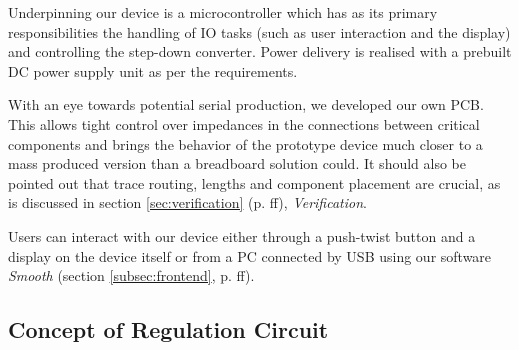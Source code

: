 
Underpinning  our  device  is  a  microcontroller which  has  as  its  primary
responsibilities the  handling of IO tasks  (such as user interaction  and the
display) and  controlling the step-down converter. Power  delivery is realised
with a prebuilt DC power supply unit as per the requirements.

With  an  eye  towards  potential  serial production,  we  developed  our  own
PCB.  This  allows tight  control over impedances  in the  connections between
critical  components and  brings the  behavior  of the  prototype device  much
closer  to  a mass  produced  version  than  a breadboard  solution  could. It
should  also  be  pointed  out  that  trace  routing,  lengths  and  component
placement are crucial,  as is discussed in  section \ref{sec:verification} (p.
\pageref{sec:verification}ff), \emph{Verification}.

Users can  interact with our device  either through a push-twist  button and a
display on the device itself or from  a PC connected by USB using our software
\emph{Smooth} (section \ref{subsec:frontend}, p. \pageref{subsec:frontend}ff).


\subsection{Concept of Regulation Circuit}

